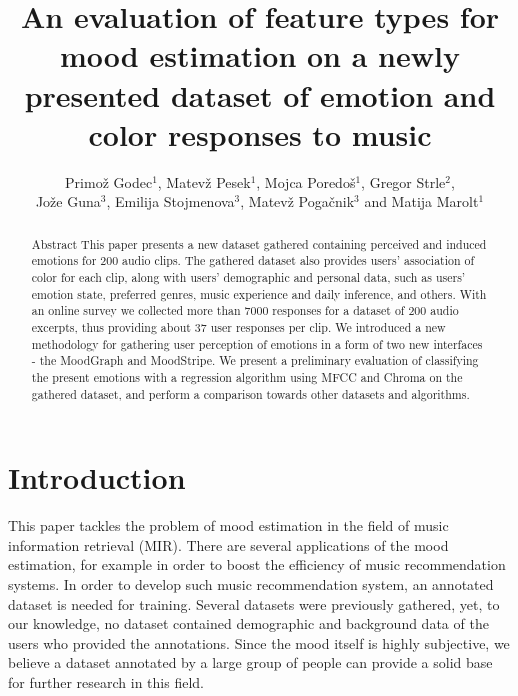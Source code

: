 \documentclass[a4paper]{article}
\begin{document}
\title{An evaluation of feature types for mood estimation on a newly presented dataset of emotion and color responses to music}

\author{Primož Godec$^{1}$, Matevž Pesek$^{1}$, Mojca Poredoš$^{1}$, Gregor Strle$^{2}$,\\ Jože Guna$^{3}$, Emilija Stojmenova$^{3}$, Matevž Pogačnik$^{3}$ and Matija Marolt$^{1}$} %



\maketitle

\begin{abstract}{Abstract}
This paper presents a new dataset gathered containing perceived and induced emotions for 200 audio clips. The gathered dataset also provides users' association of color for each clip, along with users' demographic and personal data, such as users' emotion state, preferred genres, music experience and daily inference, and others. With an online survey we collected more than 7000 responses for a dataset of 200 audio excerpts, thus providing about 37 user responses per clip. We introduced a new methodology for gathering user perception of emotions in a form of two new interfaces - the MoodGraph and MoodStripe. We present a preliminary evaluation of classifying the present emotions with a regression algorithm using MFCC and Chroma on the gathered dataset, and perform a comparison towards other datasets and algorithms. 
\end{abstract}

\section{Introduction}

This paper tackles the problem of mood estimation in the field of music information retrieval (MIR). There are several applications of the mood estimation, for example in order to boost the efficiency of music recommendation systems. In order to develop such music recommendation system, an annotated dataset is needed for training. Several datasets were previously gathered, yet, to our knowledge, no dataset contained demographic and background data of the users who provided the annotations. Since the mood itself is highly subjective, we believe a dataset annotated by a large group of people can provide a solid base for further research in this field.
\end{document}
